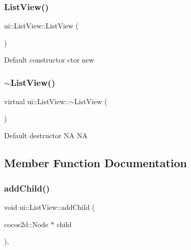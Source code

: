 \subsubsection{\texorpdfstring{List\+View()}{ListView()}\hspace{0.1cm}{\footnotesize\ttfamily [2/2]}}
{\footnotesize\ttfamily ui\+::\+List\+View\+::\+List\+View (\begin{DoxyParamCaption}{ }\end{DoxyParamCaption})}

Default constructor  ctor  new \mbox{\label{classui_1_1ListView_aef61591c247562c7516d47a98972cadc}} 
\subsubsection{\texorpdfstring{$\sim$\+List\+View()}{~ListView()}\hspace{0.1cm}{\footnotesize\ttfamily [2/2]}}
{\footnotesize\ttfamily virtual ui\+::\+List\+View\+::$\sim$\+List\+View (\begin{DoxyParamCaption}{ }\end{DoxyParamCaption})\hspace{0.3cm}{\ttfamily [virtual]}}

Default destructor  NA  NA 

\subsection{Member Function Documentation}
\mbox{\label{classui_1_1ListView_aeee2116f21f0e89de5a2e1b9cc93e012}} 
\subsubsection{\texorpdfstring{add\+Child()}{addChild()}\hspace{0.1cm}{\footnotesize\ttfamily [1/8]}}
{\footnotesize\ttfamily void ui\+::\+List\+View\+::add\+Child (\begin{DoxyParamCaption}\item[{cocos2d\+::\+Node $\ast$}]{child }\end{DoxyParamCaption})\hspace{0.3cm}{\ttfamily [override]}, {\ttfamily [virtual]}}

